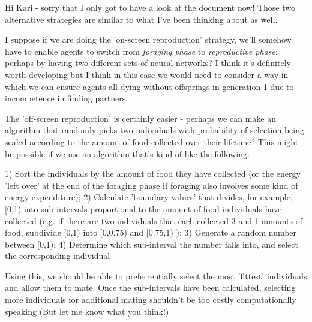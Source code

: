 \documentclass[a4paper, 12pt]{report}
\theoremstyle{definition}
\begin{document}
Hi Kari - sorry that I only got to have a look at the document now! Those two alternative strategies are similar to what I've been thinking about as well. 
\par I suppose if we are doing the 'on-screen reproduction' strategy, we'll somehow have to enable agents to switch from \emph{foraging phase} to \emph{reproductive phase};
perhaps by having two different sets of neural networks? I think it's definitely worth developing but I think in this case we would need to consider a way
in which we can ensure agents all dying without offsprings in generation 1 due to incompetence in finding partners.
\par The 'off-screen reproduction' is certainly easier - perhaps we can make an algorithm that randomly picks two individuals with probability of selection
being scaled according to the amount of food collected over their lifetime? This might be possible if we use an algorithm that's kind of like the following:
\par 1) Sort the individuals by the amount of food they have collected (or the energy 'left over' at the end of the foraging phase if foraging also involves
some kind of energy expenditure); 2) Calculate 'boundary values' that divides, for example, [0,1) into sub-intervals proportional to the amount of food
individuals have collected (e.g. if there are two individuals that each collected 3 and 1 amounts of food, subdivide [0,1) into
[0,0.75) and [0.75,1) ); 3) Generate a random number between [0,1); 4) Determine which sub-interval the number falls into, and select the corresponding individual
\par Using this, we should be able to preferrentially select the most 'fittest' individuals and allow them to mate. Once the sub-intervals have been calculated,
selecting more individuals for additional mating shouldn't be too costly computationally speaking (But let me know what you think!)
\end{document}
